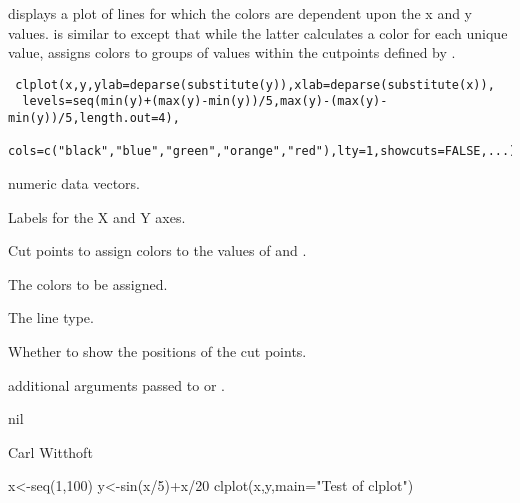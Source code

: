 \begin{Description}\relax
{} displays a plot of lines for which the colors are dependent
upon the x and y values.  is similar to 
except that while the latter calculates a color for each unique value,
 assigns colors to groups of values within the cutpoints defined
by .
\end{Description}
\begin{Usage}
\begin{verbatim}
 clplot(x,y,ylab=deparse(substitute(y)),xlab=deparse(substitute(x)),
  levels=seq(min(y)+(max(y)-min(y))/5,max(y)-(max(y)-min(y))/5,length.out=4),
  cols=c("black","blue","green","orange","red"),lty=1,showcuts=FALSE,...)
\end{verbatim}
\end{Usage}
\begin{Arguments}
\begin{ldescription}
\item[\code{x,y}] numeric data vectors.
\item[\code{ylab,xlab}] Labels for the X and Y axes.
\item[\code{levels}] Cut points to assign colors to the values of  and
.
\item[\code{cols}] The colors to be assigned.
\item[\code{lty}] The line type.
\item[\code{showcuts}] Whether to show the positions of the cut points.
\item[\code{...}] additional arguments passed to  or .
\end{ldescription}
\end{Arguments}
\begin{Value}
nil
\end{Value}
\begin{Author}\relax
Carl Witthoft
\end{Author}
\begin{SeeAlso}\relax
{}
\end{SeeAlso}
\begin{Examples}
\begin{ExampleCode}
 x<-seq(1,100)
 y<-sin(x/5)+x/20
 clplot(x,y,main="Test of clplot")
\end{ExampleCode}
\end{Examples}

